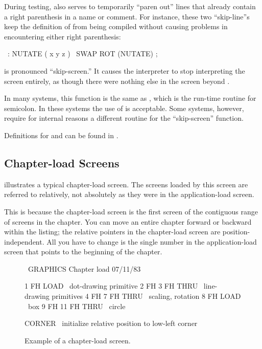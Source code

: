 During testing, \forth{\bs} also serves to temporarily ``paren out''
lines that already contain a right parenthesis in a name or comment.
For instance, these two ``skip-line''s keep the definition of
 from being compiled without causing problems in
encountering either right parenthesis:
\begin{Code}
\ : NUTATE  ( x y z )
\   SWAP ROT  (NUTATE) ;
\end{Code}
 is pronounced ``skip-screen.'' It causes the \Forth{}
interpreter to stop interpreting the screen entirely, as though there
were nothing else in the screen beyond .

In many \Forth{} systems, this function is the same as
, which is the run-time routine for
semicolon.  In these systems the use of  is acceptable.
Some \Forth{} systems, however, require for internal reasons a
different routine for the ``skip-screen'' function.

Definitions for \forthb{\bs} and  can be found in .%

\subsection{Chapter-load Screens}%
%

 illustrates a typical chapter-load screen.  The screens
loaded by this screen are referred to relatively, not absolutely as
they were in the application-load screen.

This is because the chapter-load screen is the first screen of the
contiguous range of screens in the chapter.  You can move an entire
chapter forward or backward within the listing; the relative pointers
in the chapter-load screen are position-independent.  All you have to
change is the single number in the application-load screen that points
to the beginning of the chapter.

\begin{figure*}
\caption{Example of a chapter-load screen.}

\setcounter{screen}{100}
\begin{Screen}
\ GRAPHICS                 Chapter load                 07/11/83

 1 FH LOAD            \ dot-drawing primitive
 2 FH 3 FH THRU       \ line-drawing primitives
 4 FH 7 FH THRU       \ scaling, rotation
 8 FH LOAD            \ box
 9 FH 11 FH THRU      \ circle



CORNER  \ initialize relative position to low-left corner





\end{Screen}
\end{figure*}

